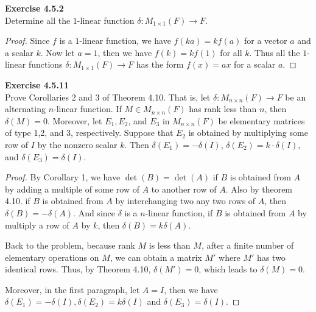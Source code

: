 \documentclass[12pt, a4paper]{article}
\theoremstyle{plain}
\newenvironment{exercise}[2][Exercise]
    { \begin{mdframed}[backgroundcolor=gray!20] \textbf{#1 #2} \\}
    {  \end{mdframed}}
\begin{document}
\begin{exercise}{4.5.2}
Determine all the $1$-linear function $\delta:M_{1\times 1}(F)\rightarrow F$.
\end{exercise}
	\begin{proof}
	Since $f$ is a $1$-linear function, we have $f(ka)=kf(a)$ for a vector $a$ and a scalar $k$. Now let $a=1$, then we have $f(k)=kf(1)$ for all $k$. Thus all the $1$-linear functions $\delta:M_{1\times 1}(F)\rightarrow F$ has the form $f(x)=ax$ for a scalar $a$.
	\end{proof}
\begin{exercise}{4.5.11}
Prove Corollaries 2 and 3 of Theorem 4.10. That is, let $\delta:M_{n\times n}(F)\rightarrow F$ be an alternating $n$-linear function. If $M\in M_{n\times n}(F)$ has rank less than $n$, then $\delta (M)=0$. Moreover, let $E_1,E_2$, and $E_3$ in $M_{n\times n}(F)$ be elementary matrices of type 1,2, and 3, respectively. Suppose that $E_2$ is obtained by multiplying some row of $I$ by the nonzero scalar $k$. Then $\delta(E_1)=-\delta(I)$, $\delta(E_2)=k\cdot \delta(I)$, and $\delta(E_3)=\delta(I)$.
\end{exercise}
	\begin{proof}
	By Corollary 1, we have $\det(B)=\det(A)$ if $B$ is obtained from $A$ by adding a multiple of some row of $A$ to another row of $A$. Also by theorem 4.10. if $B$ is obtained from $A$ by interchanging two any two rows of $A$, then $\delta(B)=-\delta(A)$. And since $\delta$ is a $n$-linear function, if $B$ is obtained from $A$ by multiply a row of $A$ by $k$, then $\delta(B)=k\delta(A)$. 
	
	Back to the problem, because rank $M$ is less than $M$, after a finite number of elementary operations on $M$, we can obtain a matrix $M'$ where $M'$ has two identical rows. Thus, by Theorem 4.10, $\delta(M')=0$, which leads to $\delta(M)=0$.
	
	Moreover, in the first paragraph, let $A=I$, then we have $\delta(E_1)=-\delta(I), \delta(E_2)=k\delta(I)$ and $\delta(E_3)=\delta(I)$.
	\end{proof}

\pagebreak
\end{document}
